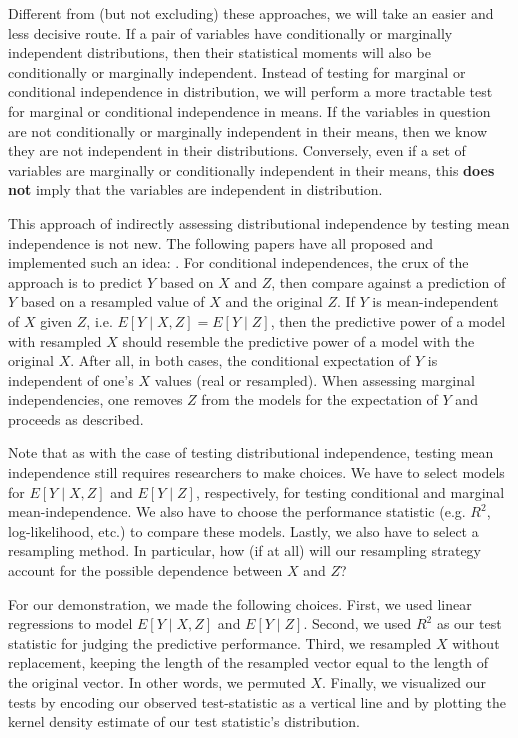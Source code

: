 Different from (but not excluding) these approaches, we will take an easier and less decisive route.
If a pair of variables have conditionally or marginally independent distributions, then their statistical moments will also be conditionally or marginally independent.
Instead of testing for marginal or conditional independence in distribution, we will perform a more tractable test for marginal or conditional independence in means.
If the variables in question are not conditionally or marginally independent in their means, then we know they are not independent in their distributions.
Conversely, even if a set of variables are marginally or conditionally independent in their means, this \textbf{does not} imply that the variables are independent in distribution.

This approach of indirectly assessing distributional independence by testing mean independence is not new.
The following papers have all proposed and implemented such an idea: \citet{burkart_2017_predictive, chalupka_2018_fast, inacio_2019_conditional}.
For conditional independences, the crux of the approach is to predict $Y$ based on $X$ and $Z$, then compare against a prediction of $Y$ based on a resampled value of $X$ and the original $Z$.
If $Y$ is mean-independent of $X$ given $Z$, i.e. $E \left[ Y \mid X, Z \right] = E\left[ Y \mid Z \right]$, then the predictive power of a model with resampled $X$ should resemble the predictive power of a model with the original $X$.
After all, in both cases, the conditional expectation of $Y$ is independent of one's $X$ values (real or resampled).
When assessing marginal independencies, one removes $Z$ from the models for the expectation of $Y$ and proceeds as described.

Note that as with the case of testing distributional independence, testing mean independence still requires researchers to make choices.
We have to select models for $E \left[ Y \mid X, Z \right]$ and $E\left[ Y \mid Z \right]$, respectively, for testing conditional and marginal mean-independence.
We also have to choose the performance statistic (e.g. $R^2$, log-likelihood, etc.) to compare these models.
Lastly, we also have to select a resampling method.
In particular, how (if at all) will our resampling strategy account for the possible dependence between $X$ and $Z$?

For our demonstration, we made the following choices.
First, we used linear regressions to model $E \left[Y \mid X, Z \right]$ and $E \left[ Y \mid Z \right]$.
Second, we used $R^2$ as our test statistic for judging the predictive performance.
Third, we resampled $X$ without replacement, keeping the length of the resampled vector equal to the length of the original vector.
In other words, we permuted $X$.
Finally, we visualized our tests by encoding our observed test-statistic as a vertical line and by plotting the kernel density estimate of our test statistic's distribution.


